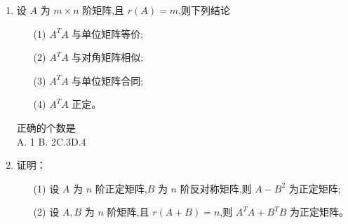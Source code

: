 \documentclass[12pt, a4paper, oneside, UTF8]{ctexbook}
\begin{document}
\begin{enumerate}[label=\arabic*.,start=6]
    \item 设 $ A $ 为 $ m \times n $ 阶矩阵,且 $ r(A) = m $,则下列结论
    \begin{enumerate}
        \item[(1)] $ A^T A $ 与单位矩阵等价;
        \item[(2)] $ A^T A $ 与对角矩阵相似;
        \item[(3)] $ A^T A $ 与单位矩阵合同;
        \item[(4)] $ A^T A $ 正定。
    \end{enumerate}
    正确的个数是 \\
    A. 1 \qquad B. 2\qquad C.3\qquad D.4 
    
    \begin{solution}
    \newpage
    \end{solution}
    
    \item 证明：
    \begin{enumerate}
        \item[(1)] 设 $ A $ 为 $ n $ 阶正定矩阵,$ B $ 为 $ n $ 阶反对称矩阵,则 $ A - B^2 $ 为正定矩阵;
        \item[(2)] 设 $ A, B $ 为 $ n $ 阶矩阵,且 $ r(A + B) = n $,则 $ A^T A + B^T B $ 为正定矩阵。
    \end{enumerate}
    
    \begin{solution}
    \newpage
    \end{solution}
\end{enumerate}

\ifx\allfiles\undefined
\end{document}
